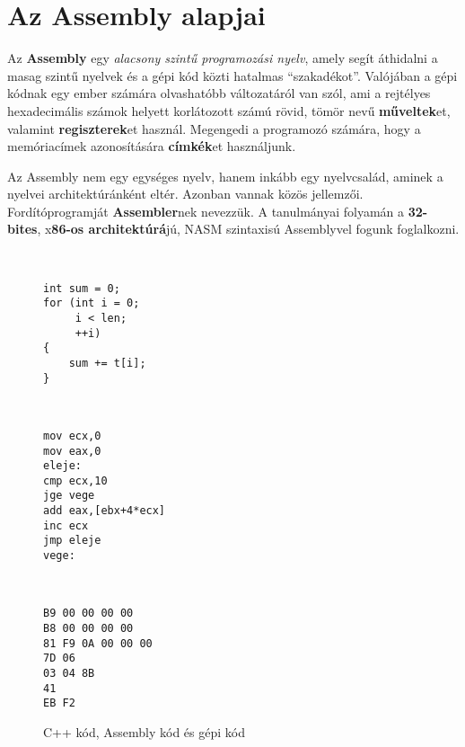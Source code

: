 \chapter{Az Assembly alapjai}

Az \textbf{Assembly} egy \textit{alacsony szintű programozási nyelv}, amely segít áthidalni a masag szintű nyelvek és a gépi kód közti hatalmas ``szakadékot''. Valójában a gépi kódnak egy ember számára olvashatóbb változatáról van szól, ami a rejtélyes hexadecimális számok helyett korlátozott számú rövid, tömör nevű \textbf{műveltek}et, valamint \textbf{regiszterek}et használ. Megengedi a programozó számára, hogy a memóriacímek azonosítására \textbf{címkék}et használjunk.

Az Assembly nem egy egységes nyelv, hanem inkább egy nyelvcsalád, aminek a nyelvei architektúránként eltér. Azonban vannak közös jellemzői. Fordítóprogramját \textbf{Assembler}nek nevezzük. A tanulmányai folyamán a \textbf{32-bites}, x\textbf{86-os architektúrá}jú, NASM szintaxisú Assemblyvel fogunk foglalkozni.

\begin{figure}[h]
	\centering
\begin{minipage}{0.05\linewidth}
	~
\end{minipage}
\begin{minipage}{0.25\linewidth}
	\begin{lstlisting}[style=cppstyle]
int sum = 0;
for (int i = 0; 
	 i < len; 
	 ++i)
{
	sum += t[i];
}
	\end{lstlisting}
\end{minipage}
\begin{minipage}{0.03\linewidth}
	~
\end{minipage}
\begin{minipage}{0.25\linewidth}
	\begin{lstlisting}[style=asmstyle]
mov ecx,0
mov eax,0
eleje:
cmp ecx,10
jge vege
add eax,[ebx+4*ecx]
inc ecx
jmp eleje
vege:
	\end{lstlisting}
\end{minipage}
\begin{minipage}{0.03\linewidth}
	~
\end{minipage}
\begin{minipage}{0.25\linewidth}
	\begin{lstlisting}[style=machinestyle]
B9 00 00 00 00
B8 00 00 00 00
81 F9 0A 00 00 00
7D 06
03 04 8B
41
EB F2
	\end{lstlisting}
\end{minipage}
\caption{C++ kód, Assembly kód és gépi kód}
\end{figure}

